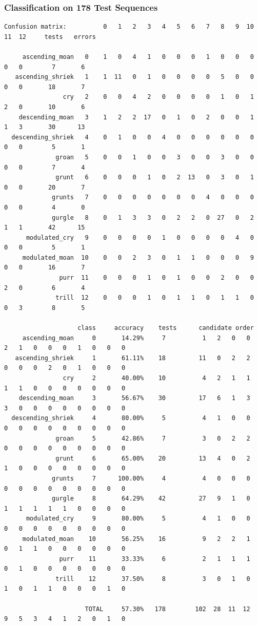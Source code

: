 \documentclass{beamer}
\begin{document}
\begin{frame}[fragile]
\frametitle{Classification on 178 Test Sequences}

\tiny{
\begin{verbatim}
Confusion matrix:          0   1   2   3   4   5   6   7   8   9  10  11  12     tests   errors

     ascending_moan   0    1   0   4   1   0   0   0   1   0   0   0   0   0        7       6
   ascending_shriek   1    1  11   0   1   0   0   0   0   5   0   0   0   0       18       7
                cry   2    0   0   4   2   0   0   0   0   1   0   1   2   0       10       6
    descending_moan   3    1   2   2  17   0   1   0   2   0   0   1   1   3       30      13
  descending_shriek   4    0   1   0   0   4   0   0   0   0   0   0   0   0        5       1
              groan   5    0   0   1   0   0   3   0   0   3   0   0   0   0        7       4
              grunt   6    0   0   0   1   0   2  13   0   3   0   1   0   0       20       7
             grunts   7    0   0   0   0   0   0   0   4   0   0   0   0   0        4       0
             gurgle   8    0   1   3   3   0   2   2   0  27   0   2   1   1       42      15
      modulated_cry   9    0   0   0   0   1   0   0   0   0   4   0   0   0        5       1
     modulated_moan  10    0   0   2   3   0   1   1   0   0   0   9   0   0       16       7
               purr  11    0   0   0   1   0   1   0   0   2   0   0   2   0        6       4
              trill  12    0   0   0   1   0   1   1   0   1   1   0   0   3        8       5

                    class     accuracy    tests      candidate order
     ascending_moan     0       14.29%     7          1   2   0   0   2   1   0   0   0   1   0   0   0
   ascending_shriek     1       61.11%    18         11   0   2   2   0   0   0   2   0   1   0   0   0
                cry     2       40.00%    10          4   2   1   1   1   1   0   0   0   0   0   0   0
    descending_moan     3       56.67%    30         17   6   1   3   3   0   0   0   0   0   0   0   0
  descending_shriek     4       80.00%     5          4   1   0   0   0   0   0   0   0   0   0   0   0
              groan     5       42.86%     7          3   0   2   2   0   0   0   0   0   0   0   0   0
              grunt     6       65.00%    20         13   4   0   2   1   0   0   0   0   0   0   0   0
             grunts     7      100.00%     4          4   0   0   0   0   0   0   0   0   0   0   0   0
             gurgle     8       64.29%    42         27   9   1   0   1   1   1   1   1   0   0   0   0
      modulated_cry     9       80.00%     5          4   1   0   0   0   0   0   0   0   0   0   0   0
     modulated_moan    10       56.25%    16          9   2   2   1   0   1   1   0   0   0   0   0   0
               purr    11       33.33%     6          2   1   1   1   0   1   0   0   0   0   0   0   0
              trill    12       37.50%     8          3   0   1   0   1   0   1   1   0   0   0   1   0

                      TOTAL     57.30%   178        102  28  11  12   9   5   3   4   1   2   0   1   0
\end{verbatim}
}
\end{frame}
\end{document}
